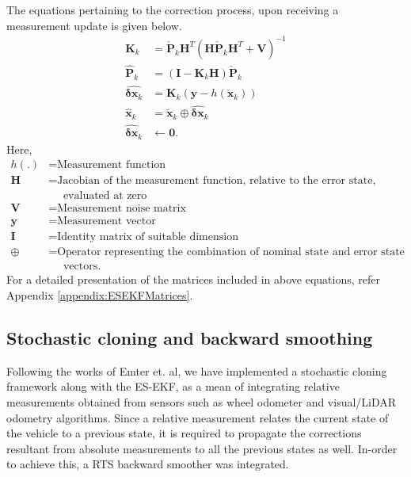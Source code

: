 The equations pertaining to the correction process, upon receiving a measurement update is given below.
\begin{align}
    \textbf{K}_k &= \check{\textbf{P}}_k\textbf{H}^T\left(\textbf{H}\check{\textbf{P}}_k\textbf{H}^T+\textbf{V}\right)^{-1} \\
    \hat{\textbf{P}}_k &= \left(\textbf{I}-\textbf{K}_k\textbf{H}\right)\check{\textbf{P}}_k\\
	\hat{\boldsymbol{\delta}\textbf{x}_k} &= \textbf{K}_k \left(\textbf{y}-h\left(\check{\textbf{x}}_k\right)\right)\\
	\hat{\textbf{x}}_k &= \check{\textbf{x}}_k \oplus \hat{\boldsymbol{\delta}\textbf{x}}_k\\
	\hat{\boldsymbol{\delta}\textbf{x}}_k & \leftarrow \textbf{0}.
\end{align}
Here,
\begin{align}
	h(.) &= \text{Measurement function}\\
	\textbf{H} &= \text{Jacobian of the measurement function, relative to the error state,}\nonumber\\
	&\quad\text{ evaluated at zero}\\
	\textbf{V} &= \text{Measurement noise matrix}\\
	\textbf{y} &= \text{Measurement vector}\\
	\textbf{I} &= \text{Identity matrix of suitable dimension}\\
	\oplus &= \text{Operator representing the combination of nominal state and error state }\nonumber\\
	&\quad\text{ vectors}.
\end{align}
For a detailed presentation of the matrices included in above equations, refer Appendix \ref{appendix:ESEKFMatrices}\cite{pa:Sola2017QuaternionKinematics}.


\subsection{Stochastic cloning and backward smoothing}
Following the works of Emter et. al\cite{pa:Emter2018StochasticCloning},  we have implemented a stochastic cloning framework along with the \gls{ES-EKF}, as a mean of integrating relative measurements obtained from sensors such as wheel odometer and visual/\gls{LiDAR} odometry algorithms. Since a relative measurement relates the current state of the vehicle to a previous state, it is required to propagate the corrections resultant from absolute measurements to all the previous states as well. In-order to achieve this, a \gls{RTS} backward smoother was integrated.


